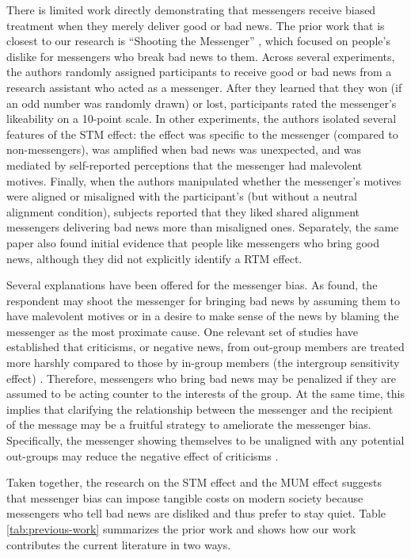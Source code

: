 There is limited work directly demonstrating that messengers receive
biased treatment when they merely deliver good or bad news. The prior
work that is closest to our research is ``Shooting the Messenger''
\citep{john2019shooting}, which focused on people's dislike for messengers
who break bad news to them. Across several experiments, the authors
randomly assigned participants to receive good or bad news from a
research assistant who acted as a messenger. After they learned that
they won (if an odd number was randomly drawn) or lost, participants
rated the messenger's likeability on a 10-point scale. In other
experiments, the authors isolated several features of the STM effect:
the effect was specific to the messenger (compared to non-messengers),
was amplified when bad news was unexpected, and was mediated by
self-reported perceptions that the messenger had malevolent motives.
Finally, when the authors manipulated whether the messenger's motives
were aligned or misaligned with the participant's (but without a neutral
alignment condition), subjects reported that they liked shared alignment
messengers delivering bad news more than misaligned ones. Separately,
the same paper also found initial evidence that people like messengers
who bring good news, although they did not explicitly identify a RTM
effect.

Several explanations have been offered for the messenger bias. As \citet{john2019shooting}
 found, the respondent may shoot the messenger for bringing
bad news by assuming them to have malevolent motives or in a desire to
make sense of the news by blaming the messenger as the most proximate
cause. One relevant set of studies have established that criticisms, or
negative news, from out-group members are treated more harshly compared
to those by in-group members (the intergroup sensitivity effect)
\citep{hornsey2002it,esposo2013shooting}. Therefore, messengers who
bring bad news may be penalized if they are assumed to be acting counter
to the interests of the group. At the same time, this implies that
clarifying the relationship between the messenger and the recipient of
the message may be a fruitful strategy to ameliorate the messenger bias.
Specifically, the messenger showing themselves to be unaligned with any
potential out-groups may reduce the negative effect of criticisms
\citep{hornsey2007groupdirected}.




Taken together, the research on the STM effect and the MUM effect
suggests that messenger bias can impose tangible costs on modern society
because messengers who tell bad news are disliked and thus prefer to
stay quiet. Table \ref{tab:previous-work} summarizes the prior work and shows how our work
contributes the current literature in two ways.


